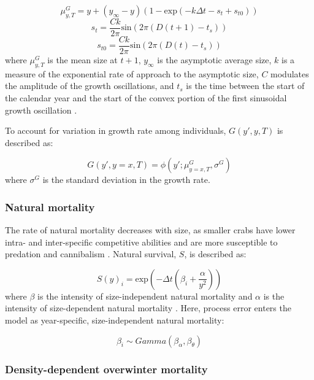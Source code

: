 \documentclass{article}
\begin{document}
\begin{equation}
\mu^G_{y,T} = y + (y_{\infty}-y)(1-\text{exp}(-k\Delta t-s_t+s_{t0}))
\end{equation}
\begin{equation}
s_t = \frac{Ck}{2\pi} \text{sin}(2\pi(D(t+1)-t_s))
\end{equation}
\begin{equation}
s_{t0} = \frac{Ck}{2\pi} \text{sin}(2\pi(D(t)-t_s))
\end{equation}
where $\mu^G_{y,T}$ is the mean size at $t+1$, $y_{\infty}$ is the asymptotic average size, $k$ is a measure of the exponential rate of approach to the asymptotic size, $C$ modulates the amplitude of the growth oscillations, and $t_s$ is the time between the start of the calendar year and the start of the convex portion of the first sinusoidal growth oscillation \parencite{garcia2012technical}.

To account for variation in growth rate among individuals, $G(y',y, T)$ is described as:

\begin{equation}
G(y',y=x, T) = \phi(y'; \mu^G_{y=x, T}, \sigma^G)
\end{equation}
where $\sigma^G$ is the standard deviation in the growth rate.

\subsubsection*{Natural mortality}

The rate of natural mortality decreases with size, as smaller crabs have lower intra- and inter-specific competitive abilities and are more susceptible to predation and cannibalism \parencite{maszczyk2018body, grosholz2021stage}. Natural survival, $S$, is described as: 

\begin{equation}
S(y)_i = \text{exp}\left(-\Delta t(\beta_i+\frac{\alpha}{y^2})\right)
\end{equation}
where $\beta$ is the intensity of size-independent natural mortality and $\alpha$ is the intensity of size-dependent natural mortality \parencite{carlson2010bayesian}. Here, process error enters the model as year-specific, size-independent natural mortality:

\begin{equation}
\beta_i \sim Gamma(\beta_{\alpha}, \beta_{\theta})
\end{equation}

\subsubsection*{Density-dependent overwinter mortality}
\end{document}
